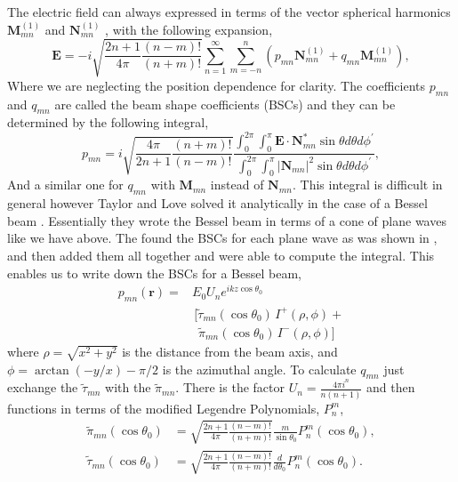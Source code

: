 \documentclass[aps,prl,twocolumn]{revtex4-1}
\newcommand{\pos}{\left(\mathbf{r} \right)}
\newcommand{\bigM}{\mathbf{M}_{mn}}
\newcommand{\bigN}{\mathbf{N}_{mn}}
\begin{document}
The electric field can always expressed in terms of the
vector spherical harmonics $\bigM^{(1)}$ and $\bigN^{(1)}$ 
\cite{bohren_absorption_2008}, with the following expansion,
\begin{equation}
  \label{eq:expansion}
  \mathbf{E} = -i \sqrt{\frac{2n+1}{4\pi}\frac{(n-m)!}{(n+m)!}}
     \sum_{n=1}^{\infty}\sum_{m=-n}^{n} \left(
     p_{mn} \bigN^{(1)}+q_{mn} \bigM^{(1)} \right),
\end{equation}
Where we are neglecting the position dependence for clarity.
The coefficients $p_{mn}$ and $q_{mn}$ are called the beam shape coefficients
(BSCs) and they can be determined by the following integral,
\begin{equation}
  \label{eq:pmnintegral}
  p_{mn} = i \sqrt{\frac{4\pi}{2n+1}\frac{(n+m)!}{(n-m)!}} 
          \frac{\int_{0}^{2\pi}\int_{0}^{\pi} 
             \mathbf{E} \cdot \bigN^* 
             \sin \theta d\theta d\phi^\prime}
          {\int_{0}^{2\pi}\int_{0}^{\pi} 
             |\bigN|^2
             \sin \theta d\theta d\phi^\prime},
\end{equation}
And a similar one for $q_{mn}$ with $\bigM$ instead of $\bigN$.
 This integral is difficult in general
however Taylor and Love solved it analytically in the case of a 
Bessel beam \cite{taylor_multipole_2009-1}. Essentially they wrote
the Bessel beam in terms of a cone of plane waves like we have above.
The found the BSCs for each plane wave as was shown in 
\cite{mackowski_calculation_1994}, and then added them all together and
were able to compute the integral. This enables us to write down the
BSCs for a Bessel beam,
\begin{align}
  \label{eq:besselBSCs}
  p_{mn}\pos = &E_0 U_n e^{ikz \cos \theta_0} \\
          &\, [ \tilde{\tau}_{mn}(\cos\theta_0)\, I^+(\rho,\phi) + \\
          &\,\,\, \tilde{\pi}_{mn}(\cos\theta_0)\, I^-(\rho,\phi) ]
\end{align}
where $\rho = \sqrt{x^2+y^2}$ is the distance from the beam axis, and 
$\phi = \arctan(-y/x)- \pi/2$ is the azimuthal angle. To calculate
$q_{mn}$ just exchange the $\tilde{\tau}_{mn}$ with the $\tilde{\pi}_{mn}$.
There is the factor
$U_n = \frac{4 \pi i^n}{n(n+1)}$ and then functions 
in terms of the modified Legendre Polynomials, $P^m_n$,
\begin{align}
  \label{eq:anglefunctions}
  \tilde{\pi}_{mn}(\cos\theta_0) &= 
      \sqrt{\frac{2n+1}{4\pi}\frac{(n-m)!}{(n+m)!}}
      \frac{m}{\sin\theta_0}P^m_n(\cos\theta_0),\\
  \tilde{\tau}_{mn}(\cos\theta_0) &= 
      \sqrt{\frac{2n+1}{4\pi}\frac{(n-m)!}{(n+m)!}}
      \frac{d}{d\theta_0}P^m_n(\cos\theta_0).
\end{align}
\end{document}
